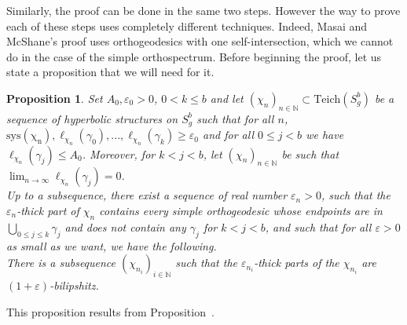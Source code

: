 \documentclass[a4paper,12pt]{article}
\newtheorem{proposition}[theorem]{Proposition}
\theoremstyle{definition}
\theoremstyle{remark}
\begin{document}
Similarly, the proof can be done in the same two steps. However the way to prove each of these steps uses completely different techniques. Indeed, Masai and McShane's proof uses orthogeodesics with one self-intersection, which we cannot do in the case of the simple orthospectrum. Before beginning the proof, let us state a proposition that we will need for it.

\begin{proposition}\label{prop:Hummel}
    Set $A_0, \varepsilon_0 >0$, $0<k\leqslant b$ and let $(\chi_n)_{n\in\mathbb{N}} \subset \mathrm{Teich}(S_g^b)$ be a sequence of hyperbolic structures on $S_g^b$ such that for all $n$, $\mathrm{sys(\chi_n)}, \ell_{\chi_n}(\gamma_0),...,\ell_{\chi_n}(\gamma_{k}) \geqslant \varepsilon_0$ and for all $0 \leqslant j < b$ we have $\ell_{\chi_{n}}(\gamma_j) \leqslant A_0$. Moreover, for $k<j<b$, let $(\chi_n)_{n\in\mathbb{N}}$ be such that $\lim_{n \to \infty} \ell_{\chi_n}(\gamma_j)=0$. \\
    Up to a subsequence, there exist a sequence of real number $\varepsilon_n>0$, such that the\\ $\varepsilon_n$-thick part of $\chi_n$ contains every simple orthogeodesic whose endpoints are in $\bigcup_{0 \leqslant j \leqslant k}\gamma_j$ and does not contain any $\gamma_j$ for $k < j < b$, and such that for all $\varepsilon>0$ as small as we want, we have the following.\\
    There is a subsequence $(\chi_{n_i})_{i\in\mathbb{N}}$ such that the $\varepsilon_{n_i}$-thick parts of the $\chi_{n_i}$ are\\ $(1+\varepsilon)$-bilipshitz.
\end{proposition}

This proposition results from Proposition~\cite[5.1~Chap.IV]{Hummel}.
\end{document}
